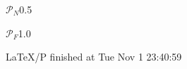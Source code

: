 \begin{tikzfigure2}
\begin{tikzsubfigure}{\label{fig:expansion:patch:3:7:4:a}}{$\mathcal{P}_N$}{0.5}
  \end{tikzsubfigure}
  \begin{tikzsubfigure}{\label{fig:expansion:patch:3:7:4:b}}{$\mathcal{P}_F$}{1.0}
    \begin{scope}[scale=5]
      
    \end{scope}
  \end{tikzsubfigure}
\end{tikzfigure2}

LaTeX/P finished at Tue Nov  1 23:40:59
